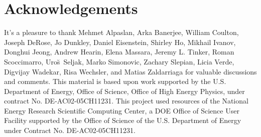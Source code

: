 \documentclass[12pt, letterpaper, preprint]{aastex63}
\begin{document}
\NewPageAfterKeywords





 





 

\section*{Acknowledgements}
It's a pleasure to thank 
    Mehmet Alpaslan, 
    Arka Banerjee, 
    William Coulton, 
    Joseph DeRose, 
    Jo Dunkley, 
    Daniel Eisenstein, 
    Shirley Ho,
    Mikhail Ivanov, 
    Donghui Jeong, 
    Andrew Hearin,
    Elena Massara,
    Jeremy L. Tinker,
    Roman Scoccimarro, 
    Uro{\u s}~Seljak,
    Marko Simonovic, 
    Zachary Slepian, 
    Licia Verde, 
    Digvijay Wadekar,
    Risa Wechsler, 
    and Matias Zaldarriaga
for valuable discussions and comments. 
This material is based upon work supported by the U.S. Department 
of Energy, Office of Science, Office of High Energy Physics, under 
contract No. DE-AC02-05CH11231.
This project used resources of the National Energy Research 
Scientific Computing Center, a DOE Office of Science User 
Facility supported by the Office of Science of the U.S. 
Department of Energy under Contract No. DE-AC02-05CH11231.



 
\end{document}

